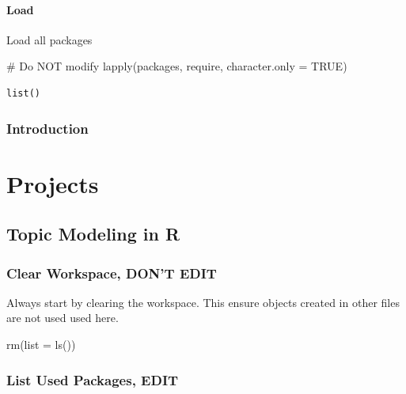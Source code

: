 \documentclass[
  letterpaper,
  DIV=11,
  numbers=noendperiod]{scrreprt}
\newenvironment{Shaded}{\begin{snugshade}}{\end{snugshade}}
\newcommand{\AttributeTok}[1]{\textcolor[rgb]{0.40,0.45,0.13}{#1}}
\newcommand{\CommentTok}[1]{\textcolor[rgb]{0.37,0.37,0.37}{#1}}
\newcommand{\ConstantTok}[1]{\textcolor[rgb]{0.56,0.35,0.01}{#1}}
\newcommand{\FunctionTok}[1]{\textcolor[rgb]{0.28,0.35,0.67}{#1}}
\newcommand{\NormalTok}[1]{\textcolor[rgb]{0.00,0.23,0.31}{#1}}
\begin{document}
\subsection*{Load}\label{load-8}

Load all packages

\begin{Shaded}
\begin{Highlighting}[]
\CommentTok{\# Do NOT modify}
\FunctionTok{lapply}\NormalTok{(packages, require, }\AttributeTok{character.only =} \ConstantTok{TRUE}\NormalTok{)}
\end{Highlighting}
\end{Shaded}

\begin{verbatim}
list()
\end{verbatim}

\section{Introduction}\label{introduction-6}

\part{Projects}

\chapter{Topic Modeling in R}\label{topic-modeling-in-r}

\section*{Clear Workspace, DON'T
EDIT}\label{clear-workspace-dont-edit-9}


Always start by clearing the workspace. This ensure objects created in
other files are not used used here.

\begin{Shaded}
\begin{Highlighting}[]
\FunctionTok{rm}\NormalTok{(}\AttributeTok{list =} \FunctionTok{ls}\NormalTok{())}
\end{Highlighting}
\end{Shaded}

\section*{List Used Packages, EDIT}\label{list-used-packages-edit-9}
\end{document}
